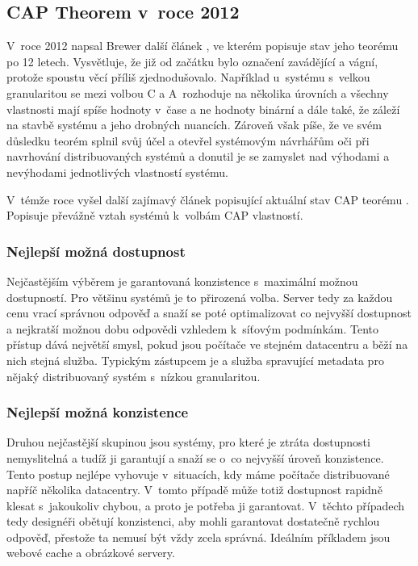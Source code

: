 \subsection{CAP Theorem v~roce 2012}
V~roce 2012 napsal Brewer další článek \cite{cap2}, ve kterém popisuje stav jeho teorému po 12 letech. Vysvětluje, že již od začátku bylo označení  zavádějící a vágní, protože spoustu věcí příliš zjednodušovalo. Například u~systému s~velkou granularitou se mezi volbou C a A~rozhoduje na několika úrovních a všechny vlastnosti mají spíše hodnoty v~čase a ne hodnoty binární a dále také, že záleží na stavbě systému a jeho drobných nuancích. Zároveň však píše, že ve svém důsledku teorém splnil svůj účel a otevřel systémovým návrhářům oči při navrhování distribuovaných systémů a donutil je se zamyslet nad výhodami a nevýhodami jednotlivých vlastností systému. 

V~témže roce vyšel další zajímavý článek popisující aktuální stav CAP teorému \cite{cap3}. Popisuje převážně vztah
systémů k~volbám CAP vlastností. 

\subsubsection{Nejlepší možná dostupnost}
Nejčastějším výběrem je garantovaná konzistence s~maximální možnou dostupností. Pro většinu systémů je to přirozená volba. Server tedy  za každou cenu vrací správnou odpověď a snaží se poté optimalizovat co nejvyšší dostupnost a nejkratší možnou dobu odpovědi vzhledem k~síťovým podmínkám. Tento přístup dává největší smysl, pokud jsou počítače ve stejném datacentru a běží na nich stejná služba. Typickým zástupcem je  a služba spravující metadata pro nějaký distribuovaný systém s~nízkou granularitou.

\subsubsection{Nejlepší možná konzistence} 
Druhou nejčastější skupinou jsou systémy, pro které je ztráta dostupnosti nemyslitelná a tudíž ji garantují a snaží se o~co nejvyšší úroveň konzistence. Tento postup nejlépe vyhovuje v~situacích, kdy máme počítače distribuované napříč několika datacentry. V~tomto případě může totiž dostupnost rapidně klesat s~jakoukoliv chybou, a proto je potřeba ji garantovat. V~těchto případech tedy designéři obětují konzistenci, aby mohli garantovat dostatečně rychlou odpověď, přestože ta nemusí být vždy zcela správná. Ideálním příkladem jsou webové cache a obrázkové servery.

